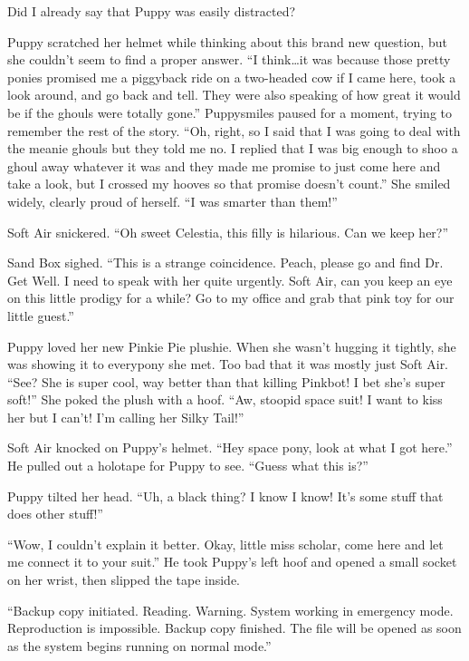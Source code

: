 Did I already say that Puppy was easily distracted?

Puppy scratched her helmet while thinking about this brand new question, but she couldn't seem to find a proper answer. ``I think\dots it was because those pretty ponies promised me a piggyback ride on a two-headed cow if I came here, took a look around, and go back and tell. They were also speaking of how great it would be if the ghouls were totally gone.'' Puppysmiles paused for a moment, trying to remember the rest of the story. ``Oh, right, so I said that I was going to deal with the meanie ghouls but they told me no. I replied that I was big enough to shoo a ghoul away whatever it was and they made me promise to just come here and take a look, but I crossed my hooves so that promise doesn't count.'' She smiled widely, clearly proud of herself. ``I was smarter than them!''

Soft Air snickered. ``Oh sweet Celestia, this filly is hilarious. Can we keep her?''

Sand Box sighed. ``This is a strange coincidence. Peach, please go and find Dr. Get Well. I need to speak with her quite urgently. Soft Air, can you keep an eye on this little prodigy for a while? Go to my office and grab that pink toy for our little guest.''


\horizonline


Puppy loved her new Pinkie Pie plushie. When she wasn't hugging it tightly, she was showing it to everypony she met. Too bad that it was mostly just Soft Air. ``See? She is super cool, way better than that killing Pinkbot! I bet she's super soft!'' She poked the plush with a hoof. ``Aw, stoopid space suit! I want to kiss her but I can't! I'm calling her Silky Tail!''

Soft Air knocked on Puppy's helmet. ``Hey space pony, look at what I got here.'' He pulled out a holotape for Puppy to see. ``Guess what this is?''

Puppy tilted her head. ``Uh, a black thing? I know I know! It's some stuff that does other stuff!''

``Wow, I couldn't explain it better. Okay, little miss scholar, come here and let me connect it to your suit.'' He took Puppy's left hoof and opened a small socket on her wrist, then slipped the tape inside.

{\mten ``Backup copy initiated. Reading. Warning. System working in emergency mode. Reproduction is impossible. Backup copy finished. The file will be opened as soon as the system begins running on normal mode.''}

